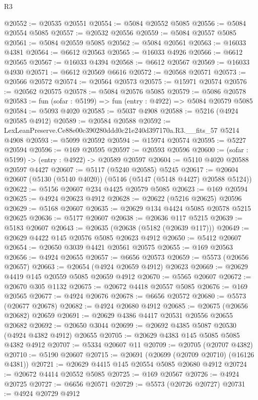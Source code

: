 \begin{lexlean}{R3}
\begin{coremodule}
@20552 := @20535 @20551
@20554 := @5084 @20552 @5085
@20556 := @5084 @20554 @5085
@20557 := @20532 @20556
@20559 := @5084 @20557 @5085
@20561 := @5084 @20559 @5085
@20562 := @5084 @20561
@20563 := @16033 @4381
@20564 := @6612 @20563
@20565 := @16033 @4926
@20566 := @6612 @20565
@20567 := @16033 @4394
@20568 := @6612 @20567
@20569 := @16033 @4930
@20571 := @6612 @20569 @6616
@20572 := @20568 @20571
@20573 := @20566 @20572
@20574 := @20564 @20573
@20575 := @15971 @20574
@20576 := @20562 @20575
@20578 := @5084 @20576 @5085
@20579 := @5086 @20578
@20583 := fun (sofar : @5199) => fun (entry : @4922) => @5084 @20579 @5085
@20584 := @5093 @4020
@20585 := @5037 @4908
@20588 := @5216 (@4924 @20585 @4912)
@20589 := @20584 @20588
@20592 := LexLeanPreserve.Ce88e00c390280ddd0c21e240d397170a.R3.__fits_57 @5214 @4908
@20593 := @5099 @20592
@20594 := @15974 @20574
@20595 := @5227 @20594
@20596 := @169 @20595
@20597 := @20593 @20596
@20600 := (sofar : @5199) -> (entry : @4922) -> @20589 @20597
@20604 := @5110 @4020 @20588 @20597 @4427
@20607 := @5117 (@5240 @20585) @5245
@20617 := @20604 @20607 (@5130 (@5140 @4020)) (@5146 (@5147 (@5148 @4427) @20588 @5124))
@20622 := @5156 @20607 @234 @4425 @20579 @5085
@20623 := @169 @20594
@20625 := @4924 @20623 @4912
@20628 := @20622 (@5216 @20625) @20596
@20629 := @5168 @20607
@20635 := @20629 @134 @4424 @5085 @20578 @5215 @20625
@20636 := @5177 @20607
@20638 := @20636 @117 @5215
@20639 := @5183 @20607
@20643 := @20635 (@20638 (@5182 (@20639 @117)))
@20649 := @20629 @4422 @145 @20576 @5085 @20623 @4912
@20650 := @5412 @20607
@20654 := @20650 @3039 @4421 @20561 @20575
@20655 := @169 @20563
@20656 := @4924 @20655
@20657 := @6656 @20573
@20659 := @5573 (@20656 @20657)
@20663 := @20654 (@4924 @20659 @4912) @20623
@20669 := @20629 @4419 @145 @20559 @5085 @20659 @4912
@20670 := @5565 @20607
@20672 := @20670 @305 @1132
@20675 := @20672 @4418 @20557 @5085
@20676 := @169 @20565
@20677 := @4924 @20676
@20678 := @6656 @20572
@20680 := @5573 (@20677 @20678)
@20682 := @4924 @20680 @4912
@20685 := @20675 (@20656 @20682) @20659
@20691 := @20629 @4386 @4417 @20531 @20556 @20655 @20682
@20692 := @20650 @3044
@20699 := @20692 @4385 @5087 @20530 (@4924 @4382 @4912) @20655
@20705 := @20629 @4383 @145 @5085 @5085 @4382 @4912
@20707 := @5334 @20607 @11
@20709 := @20705 (@20707 @4382)
@20710 := @5190 @20607
@20715 := @20691 (@20699 (@20709 @20710) (@16126 @4381))
@20721 := @20629 @4415 @145 @20554 @5085 @20680 @4912
@20724 := @20672 @4414 @20552 @5085
@20725 := @169 @20567
@20726 := @4924 @20725
@20727 := @6656 @20571
@20729 := @5573 (@20726 @20727)
@20731 := @4924 @20729 @4912

\end{coremodule}
\end{lexlean}
